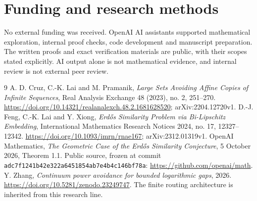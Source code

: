 \documentclass[
  11pt,
]{article}
\begin{document}
\section*{Funding and research methods}
No external funding was received. OpenAI AI assistants supported
mathematical exploration, internal proof checks, code development and
manuscript preparation. The written proofs and exact verification
materials are public, with their scopes stated explicitly. AI output
alone is not mathematical evidence, and internal review is not external
peer review.

\begin{thebibliography}{9}
 A. D. Cruz, C.-K. Lai and M. Pramanik,
\emph{Large Sets Avoiding Affine Copies of Infinite Sequences},
Real Analysis Exchange 48 (2023), no. 2, 251--270.
\url{https://doi.org/10.14321/realanalexch.48.2.1681628520}; arXiv:2204.12720v1.
 D.-J. Feng, C.-K. Lai and Y. Xiong,
\emph{Erd\H{o}s Similarity Problem via Bi-Lipschitz Embedding},
International Mathematics Research Notices 2024, no. 17, 12327--12342.
\url{https://doi.org/10.1093/imrn/rnae167}; arXiv:2312.01319v1.
 OpenAI Mathematics,
\emph{The Geometric Case of the Erd\H{o}s Similarity Conjecture},
5 October 2026, Theorem 1.1. Public source, frozen at commit
\texttt{adc7f1241b42e322a6451854ab7e4b4c146bf78a}:
\url{https://github.com/openai/math}.
 Y. Zhang, \emph{Continuum power avoidance for bounded logarithmic gaps},
2026. \url{https://doi.org/10.5281/zenodo.23249747}.
The finite routing architecture is inherited from this research line.
\end{thebibliography}
\end{document}

